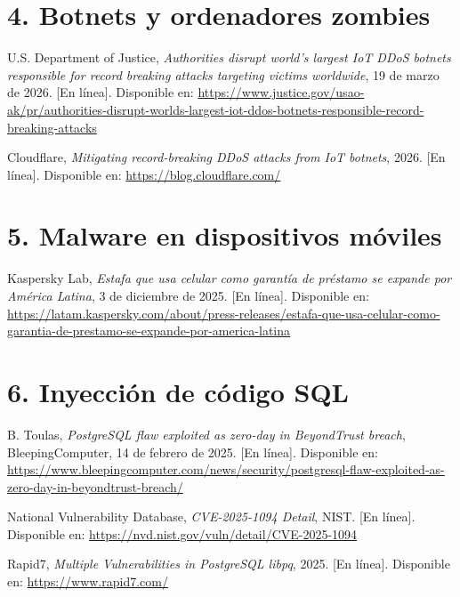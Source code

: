 \section*{4. Botnets y ordenadores zombies}
\begin{enumerate}[label={[}\arabic*{]}, start=7]
    \item U.S. Department of Justice, \textit{Authorities disrupt world's largest IoT DDoS botnets responsible for record breaking attacks targeting victims worldwide}, 19 de marzo de 2026. [En línea]. Disponible en: \url{https://www.justice.gov/usao-ak/pr/authorities-disrupt-worlds-largest-iot-ddos-botnets-responsible-record-breaking-attacks}
    \item Cloudflare, \textit{Mitigating record-breaking DDoS attacks from IoT botnets}, 2026. [En línea]. Disponible en: \url{https://blog.cloudflare.com/}
\end{enumerate}

\section*{5. Malware en dispositivos móviles}
\begin{enumerate}[label={[}\arabic*{]}, start=9]
    \item Kaspersky Lab, \textit{Estafa que usa celular como garantía de préstamo se expande por América Latina}, 3 de diciembre de 2025. [En línea]. Disponible en: \url{https://latam.kaspersky.com/about/press-releases/estafa-que-usa-celular-como-garantia-de-prestamo-se-expande-por-america-latina}
\end{enumerate}

\section*{6. Inyección de código SQL}
\begin{enumerate}[label={[}\arabic*{]}, start=11]
    \item B. Toulas, \textit{PostgreSQL flaw exploited as zero-day in BeyondTrust breach}, BleepingComputer, 14 de febrero de 2025. [En línea]. Disponible en: \url{https://www.bleepingcomputer.com/news/security/postgresql-flaw-exploited-as-zero-day-in-beyondtrust-breach/}
    \item National Vulnerability Database, \textit{CVE-2025-1094 Detail}, NIST. [En línea]. Disponible en: \url{https://nvd.nist.gov/vuln/detail/CVE-2025-1094}
    \item Rapid7, \textit{Multiple Vulnerabilities in PostgreSQL libpq}, 2025. [En línea]. Disponible en: \url{https://www.rapid7.com/}
\end{enumerate}

